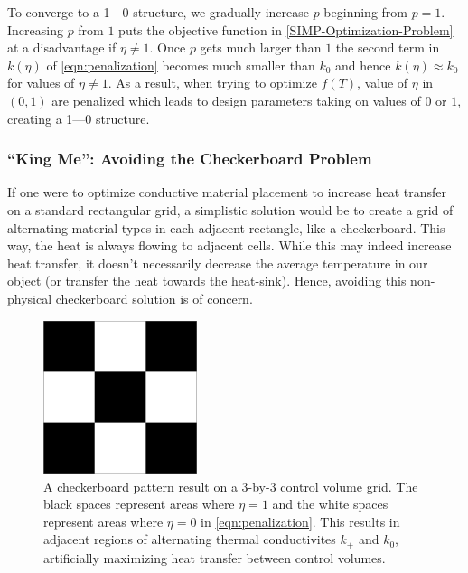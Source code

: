 To converge to a 1---0 structure, we gradually increase $p$ beginning from $p=1$. Increasing $p$ from $1$ puts the objective function in \eqref{SIMP-Optimization-Problem} at a disadvantage if $\eta\neq1$. Once $p$ gets much larger than $1$ the second term in $k(\eta)$ of \eqref{eqn:penalization} becomes much smaller than $k_0$ and hence $k(\eta)\approx k_0$ for values of $\eta\neq1$. As a result, when trying to optimize $f(T)$, value of $\eta$ in $(0,1)$ are penalized which leads to design parameters taking on values of $0$ or $1$, creating a 1---0 structure.

\subsubsection*{``King Me'': Avoiding the Checkerboard Problem}

If one were to optimize conductive material placement to increase heat transfer on a standard rectangular grid, a simplistic solution would be to create a grid of alternating material types in each adjacent rectangle, like a checkerboard. This way, the heat is always flowing to adjacent cells. While this may indeed increase heat transfer, it doesn't necessarily decrease the average temperature in our object (or transfer the heat towards the heat-sink). Hence, avoiding this non-physical checkerboard solution is of concern.

\begin{figure}
	\centering
	\includegraphics[width=0.4\textwidth]{Chapter_II_SIMP_Optimization/Images/3x3-Checkerboard.png}
	\caption[Checkerboard Pattern]{A checkerboard pattern result on a 3-by-3 control volume grid. The black spaces represent areas where $\eta=1$ and the white spaces represent areas where $\eta=0$ in \eqref{eqn:penalization}. This results in adjacent regions of alternating thermal conductivites $k_+$ and $k_0$, artificially maximizing heat transfer between control volumes.}
	\label{fig:3x3-Checkerboard}
\end{figure}

